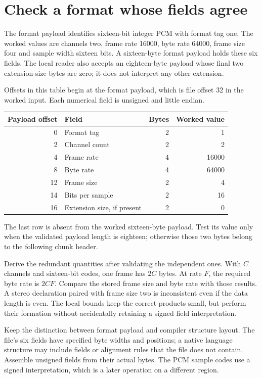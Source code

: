 \section{Check a format whose fields agree}
The format payload identifies sixteen-bit integer PCM with format tag one. The worked
values are channels two, frame rate 16000, byte rate 64000, frame size four and sample
width sixteen bits. A sixteen-byte format payload holds these six fields. The local
reader also accepts an eighteen-byte payload whose final two extension-size bytes are
zero; it does not interpret any other extension.

Offsets in this table begin at the format payload, which is file offset 32 in the
worked input. Each numerical field is unsigned and little endian.
\begin{center}
  \begin{tabular}{rlrr}
    Payload offset & Field                      & Bytes & Worked value \\
    \hline
    0              & Format tag                 & 2     & 1            \\
    2              & Channel count              & 2     & 2            \\
    4              & Frame rate                 & 4     & 16000        \\
    8              & Byte rate                  & 4     & 64000        \\
    12             & Frame size                 & 2     & 4            \\
    14             & Bits per sample            & 2     & 16           \\
    16             & Extension size, if present & 2     & 0            \\
  \end{tabular}
\end{center}
The last row is absent from the worked sixteen-byte payload. Test its value only
when the validated payload length is eighteen; otherwise those two bytes belong
to the following chunk header.

Derive the redundant quantities after validating the independent ones. With $C$
channels and sixteen-bit codes, one frame has $2C$ bytes. At rate $F$, the required byte
rate is $2CF$. Compare the stored frame size and byte rate with those results. A
stereo declaration paired with frame size two is inconsistent even if the data length
is even. The local bounds keep the correct products small, but perform their formation
without accidentally retaining a signed field interpretation.

Keep the distinction between format payload and compiler structure layout. The file's
six fields have specified byte widths and positions; a native language structure may
include fields or alignment rules that the file does not contain. Assemble unsigned
fields from their actual bytes. The PCM sample codes use a signed interpretation,
which is a later operation on a different region.
